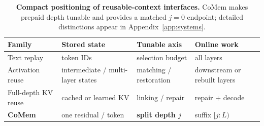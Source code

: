 \begin{table}[t]
\centering
\small
\setlength{\tabcolsep}{5pt}
\renewcommand{\arraystretch}{1.05}
\begin{tabular}{@{}p{}p{}p{}p{}@{}}
\toprule
\textbf{Family} & \textbf{Stored state} & \textbf{Tunable axis} &
\textbf{Online work} \\
\midrule
Text replay & token IDs & selection budget & all layers \\
Activation reuse & intermediate / multi-layer states & matching / restoration & downstream or rebuilt layers \\
Full-depth KV reuse & cached or learned KV & linking / repair & repair + decode \\
\textbf{CoMem} & one residual / token & \textbf{split depth $j$} & suffix $[j{:}L)$ \\
\bottomrule
\end{tabular}
\caption{\textbf{Compact positioning of reusable-context interfaces.}
CoMem makes prepaid depth tunable and provides a matched $j{=}0$ endpoint;
detailed distinctions appear in Appendix~\ref{app:systems}.}
\label{tab:priorart}
\end{table}
